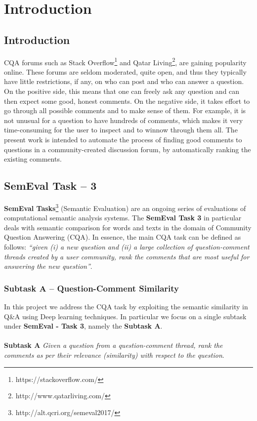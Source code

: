 \documentclass[12pt, a4paper, oneside]{Thesis} %
\newcommand{\mychapter}[2]{
    \setcounter{chapter}{#1}
    \setcounter{section}{0}
    \chapter*{#2}
    \addcontentsline{toc}{chapter}{#2}
    \lhead{\emph{#2}}
}
\begin{document}

\mychapter{1}{Introduction}

\section{Introduction}

CQA forums such as Stack Overflow\footnote{https://stackoverflow.com/} and Qatar Living\footnote{http://www.qatarliving.com/}, are gaining popularity online. These forums are seldom moderated, quite open, and thus they typically have little restrictions, if any, on who can post and who can answer a question. On the positive side, this means that one can freely ask any question and can then expect some good, honest comments. On the negative side, it takes effort to go through all possible comments and to make sense of them. For example, it is not unusual for a question to have hundreds of comments, which makes it very time-consuming for the user to inspect and to winnow through them all. The present work is intended to automate the process of finding good comments to questions in a community-created discussion forum, by automatically ranking the existing comments.

\section{SemEval Task -- 3}

\textbf{SemEval Tasks}\footnote{http://alt.qcri.org/semeval2017/} (Semantic Evaluation) are an ongoing series of evaluations of computational semantic analysis systems. The \textbf{SemEval Task 3} in particular deals with semantic comparison for words and texts in the domain of Community Question Answering (CQA). In essence, the main CQA task can be defined as follows: \textit{“given (i) a new question and (ii) a large collection of question-comment threads created by a user community, rank the comments that are most useful for answering the new question”}.

\subsection{Subtask A -- Question-Comment Similarity}
In this project we address the CQA task by exploiting the semantic similarity in Q\&A using Deep learning techniques. In particular we focus on a single subtask under \textbf{SemEval - Task 3}, namely the \textbf{Subtask A}. \\ \\
\textbf{Subtask A} \textit{Given a question from a question-comment thread, rank the comments as per their relevance (similarity) with respect to the question}.
\end{document}
